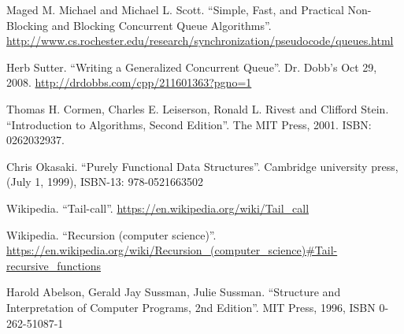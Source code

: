 \documentclass[b5paper]{article}
\begin{document}
\begin{thebibliography}{99}

Maged M. Michael and Michael L. Scott. ``Simple, Fast, and Practical Non-Blocking and Blocking Concurrent Queue Algorithms''. \url{http://www.cs.rochester.edu/research/synchronization/pseudocode/queues.html}

Herb Sutter. ``Writing a Generalized Concurrent Queue''. Dr. Dobb's Oct 29, 2008. \url{http://drdobbs.com/cpp/211601363?pgno=1}

Thomas H. Cormen, Charles E. Leiserson, Ronald L. Rivest and Clifford Stein. ``Introduction to Algorithms, Second Edition''. The MIT Press, 2001. ISBN: 0262032937.

Chris Okasaki. ``Purely Functional Data Structures''. Cambridge university press, (July 1, 1999), ISBN-13: 978-0521663502

Wikipedia. ``Tail-call''. \url{https://en.wikipedia.org/wiki/Tail_call}

Wikipedia. ``Recursion (computer science)''. \url{https://en.wikipedia.org/wiki/Recursion_(computer_science)#Tail-recursive_functions}

Harold Abelson, Gerald Jay Sussman, Julie Sussman. ``Structure and Interpretation of Computer Programs, 2nd Edition''. MIT Press, 1996, ISBN 0-262-51087-1

\end{thebibliography}

\expandafter\enddocument
\fi
\end{document}
